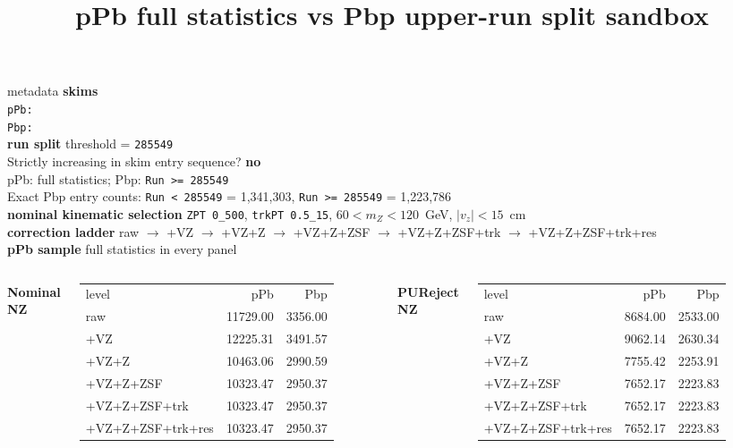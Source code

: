 \documentclass[aspectratio=169]{beamer}
\title{pPb full statistics vs Pbp upper-run split sandbox}
\date{}
\begin{document}
\begin{frame}
  \titlepage
\end{frame}

\begin{frame}[t]{metadata}
  \tiny
  \textbf{skims}\\
  \texttt{pPb: }\\
  \texttt{Pbp: }\\
  \vspace{0.35em}
  \textbf{run split} threshold = \texttt{285549}\\
  Strictly increasing in skim entry sequence? \textbf{no}\\
  pPb: full statistics; Pbp: \texttt{Run >= 285549}\\
  Exact Pbp entry counts: \texttt{Run < 285549} = 1,341,303, \texttt{Run >= 285549} = 1,223,786\\
  \vspace{0.35em}
  \textbf{nominal kinematic selection} \texttt{ZPT 0\_500}, \texttt{trkPT 0.5\_15}, $60 < m_Z < 120$~GeV, $|v_z| < 15$~cm\\
  \textbf{correction ladder} raw $\to$ +VZ $\to$ +VZ+Z $\to$ +VZ+Z+ZSF $\to$ +VZ+Z+ZSF+trk $\to$ +VZ+Z+ZSF+trk+res\\
  \textbf{pPb sample} full statistics in every panel\\
  \vspace{0.4em}
  \begin{columns}[t,onlytextwidth]
    \centering
    \textbf{Nominal NZ}\\[-0.2em]
    \scriptsize
    \begin{tabular}{lrr}
      level & pPb & Pbp \\
raw & 11729.00 & 3356.00 \\
+VZ & 12225.31 & 3491.57 \\
+VZ+Z & 10463.06 & 2990.59 \\
+VZ+Z+ZSF & 10323.47 & 2950.37 \\
+VZ+Z+ZSF+trk & 10323.47 & 2950.37 \\
+VZ+Z+ZSF+trk+res & 10323.47 & 2950.37 \\
    \end{tabular}
    \centering
    \textbf{PUReject NZ}\\[-0.2em]
    \scriptsize
    \begin{tabular}{lrr}
      level & pPb & Pbp \\
raw & 8684.00 & 2533.00 \\
+VZ & 9062.14 & 2630.34 \\
+VZ+Z & 7755.42 & 2253.91 \\
+VZ+Z+ZSF & 7652.17 & 2223.83 \\
+VZ+Z+ZSF+trk & 7652.17 & 2223.83 \\
+VZ+Z+ZSF+trk+res & 7652.17 & 2223.83 \\
    \end{tabular}
  \end{columns}
\end{frame}
\end{document}
